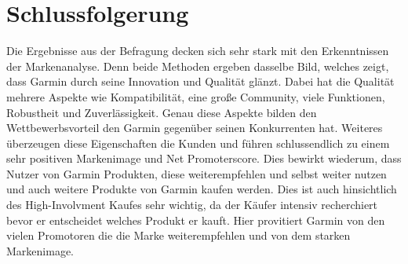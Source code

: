 \section{Schlussfolgerung} \label{sec:schlulssfolgerung}

Die Ergebnisse aus der Befragung decken sich sehr stark mit den Erkenntnissen der Markenanalyse. Denn beide Methoden ergeben dasselbe Bild, welches zeigt, dass Garmin durch seine Innovation und Qualität glänzt. Dabei hat die Qualität mehrere Aspekte wie Kompatibilität, eine große Community, viele Funktionen, Robustheit und Zuverlässigkeit. Genau diese Aspekte bilden den Wettbewerbsvorteil den Garmin gegenüber seinen Konkurrenten hat. Weiteres überzeugen diese Eigenschaften die Kunden und führen schlussendlich zu einem sehr positiven Markenimage und Net Promoterscore. Dies bewirkt wiederum, dass Nutzer von Garmin Produkten, diese weiterempfehlen und selbst weiter nutzen und auch weitere Produkte von Garmin kaufen werden. Dies ist auch hinsichtlich des High-Involvment Kaufes sehr wichtig, da der Käufer intensiv recherchiert bevor er entscheidet welches Produkt er kauft. Hier provitiert Garmin von den vielen Promotoren die die Marke weiterempfehlen und von dem starken Markenimage. 